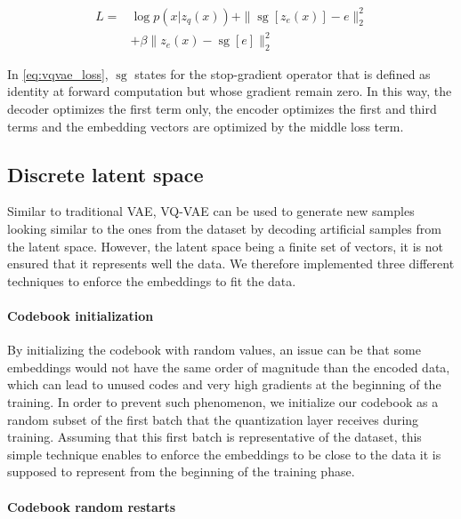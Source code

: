 \documentclass{article}
\DeclareMathOperator{\sg}{\text{sg}}
\begin{document}
\begin{equation}
\begin{split}
    L = & \log p(x|z_q(x)) + \|\sg[z_e(x)]-e\|_2^2\\
    & +\beta\|z_e(x)-\sg[e]\|_2^2
\end{split}
    \label{eq:vqvae_loss}
\end{equation}

In \autoref{eq:vqvae_loss}, $\sg$ states for the stop-gradient operator that is defined as identity at forward computation but whose gradient remain zero. In this way, the decoder optimizes the first term only, the encoder optimizes the first and third terms and the embedding vectors are optimized by the middle loss term.

\subsection{Discrete latent space}

Similar to traditional VAE, VQ-VAE can be used to generate new samples looking similar to the ones from the dataset by decoding artificial samples from the latent space. However, the latent space being a finite set of vectors, it is not ensured that it represents well the data. We therefore implemented three different techniques to enforce the embeddings to fit the data.

\paragraph*{Codebook initialization}

By initializing the codebook with random values, an issue can be that some embeddings would not have the same order of magnitude than the encoded data, which can lead to unused codes and very high gradients at the beginning of the training. In order to prevent such phenomenon, we initialize our codebook as a random subset of the first batch that the quantization layer receives during training. Assuming that this first batch is representative of the dataset, this simple technique enables to enforce the embeddings to be close to the data it is supposed to represent from the beginning of the training phase.

\paragraph*{Codebook random restarts}
\end{document}
